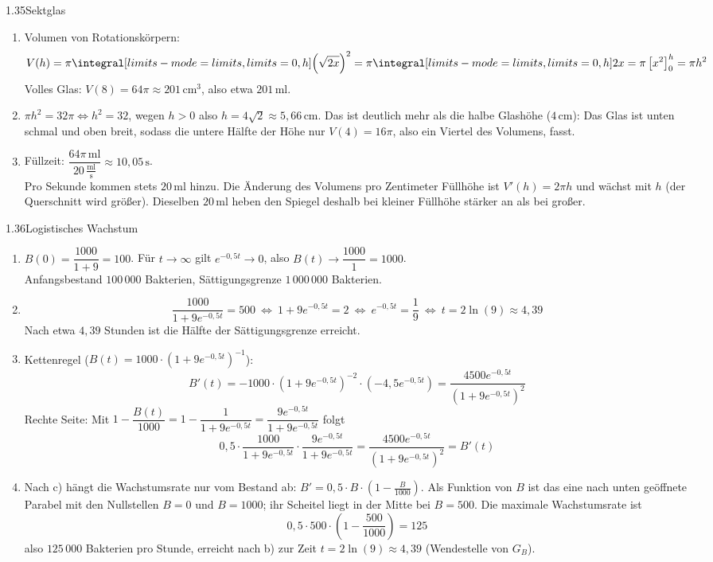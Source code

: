 \begin{loesung}{1.35}{Sektglas}
\begin{enumerate}[label=\alph*)]
  \item Volumen von Rotationskörpern:
  \[V(h) = \pi\integral[limits-mode=limits,limits={0, h}]{\left(\sqrt{2x}\right)^2} = \pi\integral[limits-mode=limits,limits={0, h}]{2x} = \pi\left[x^2\right]_0^h = \pi h^2\]
  Volles Glas: $V(8) = 64\pi\approx 201\,\text{cm}^3$, also etwa $201\,\text{ml}$.
  \item $\pi h^2 = 32\pi\Longleftrightarrow h^2 = 32$, wegen $h>0$ also $h = 4\sqrt{2}\approx 5{,}66\,\text{cm}$. Das ist deutlich mehr als die halbe Glashöhe ($4\,\text{cm}$): Das Glas ist unten schmal und oben breit, sodass die untere Hälfte der Höhe nur $V(4) = 16\pi$, also ein Viertel des Volumens, fasst.
  \item Füllzeit: $\dfrac{64\pi\,\text{ml}}{20\,\frac{\text{ml}}{\text{s}}}\approx 10{,}05\,\text{s}$.\\
  Pro Sekunde kommen stets $20\,\text{ml}$ hinzu. Die Änderung des Volumens pro Zentimeter Füllhöhe ist $V'(h) = 2\pi h$ und wächst mit $h$ (der Querschnitt wird größer). Dieselben $20\,\text{ml}$ heben den Spiegel deshalb bei kleiner Füllhöhe stärker an als bei großer.
\end{enumerate}
\end{loesung}

\begin{loesung}{1.36}{Logistisches Wachstum}
\begin{enumerate}[label=\alph*)]
  \item $B(0) = \dfrac{1000}{1+9} = 100$. Für $t\longrightarrow\infty$ gilt $e^{-0{,}5t}\longrightarrow 0$, also $B(t)\longrightarrow\dfrac{1000}{1} = 1000$.\\
  Anfangsbestand $100\,000$ Bakterien, Sättigungsgrenze $1\,000\,000$ Bakterien.
  \item \[\dfrac{1000}{1+9e^{-0{,}5t}} = 500\ \Longleftrightarrow\ 1+9e^{-0{,}5t} = 2\ \Longleftrightarrow\ e^{-0{,}5t} = \dfrac{1}{9}\ \Longleftrightarrow\ t = 2\ln{(9)}\approx 4{,}39\]
  Nach etwa $4{,}39$ Stunden ist die Hälfte der Sättigungsgrenze erreicht.
  \item Kettenregel ($B(t) = 1000\cdot(1+9e^{-0{,}5t})^{-1}$):
  \[B'(t) = -1000\cdot(1+9e^{-0{,}5t})^{-2}\cdot(-4{,}5e^{-0{,}5t}) = \dfrac{4500e^{-0{,}5t}}{(1+9e^{-0{,}5t})^2}\]
  Rechte Seite: Mit $1-\dfrac{B(t)}{1000} = 1-\dfrac{1}{1+9e^{-0{,}5t}} = \dfrac{9e^{-0{,}5t}}{1+9e^{-0{,}5t}}$ folgt
  \[0{,}5\cdot\dfrac{1000}{1+9e^{-0{,}5t}}\cdot\dfrac{9e^{-0{,}5t}}{1+9e^{-0{,}5t}} = \dfrac{4500e^{-0{,}5t}}{(1+9e^{-0{,}5t})^2} = B'(t)\]
  \item Nach c) hängt die Wachstumsrate nur vom Bestand ab: $B' = 0{,}5\cdot B\cdot\left(1-\frac{B}{1000}\right)$. Als Funktion von $B$ ist das eine nach unten geöffnete Parabel mit den Nullstellen $B=0$ und $B=1000$; ihr Scheitel liegt in der Mitte bei $B=500$. Die maximale Wachstumsrate ist
  \[0{,}5\cdot 500\cdot\left(1-\dfrac{500}{1000}\right) = 125\]
  also $125\,000$ Bakterien pro Stunde, erreicht nach b) zur Zeit $t = 2\ln{(9)}\approx 4{,}39$ (Wendestelle von $G_B$).
\end{enumerate}
\end{loesung}

